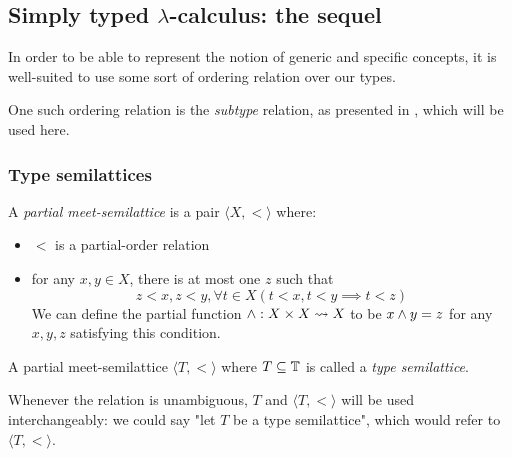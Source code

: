 \documentclass[main.tex]{subfiles}
\begin{document}
\subsection{Simply typed $\lambda$-calculus: the sequel}
\label{sec:lambda}

In order to be able to represent the notion of generic and specific concepts,
it is well-suited to use some sort of ordering relation over our types.

One such ordering relation is the \emph{subtype} relation, as presented in
\cite[chap.~15]{pierce}, which will be used here.


\subsubsection{Type semilattices}
\begin{defn}
    A \emph{partial meet-semilattice} is a pair $\langle X, \less \rangle$ where:
    \begin{itemize}
        \item $\less$ is a partial-order relation
        \item for any $x, y \in X$, there is at most one $z$ such that
        \[  z \less x, z \less y,
            \forall t \in X (t \less x, t \less y \implies t \less z) \]
        We can define the partial function $\wedge : X \times X \leadsto X$ to
        be $x \wedge y = z$ for any $x, y, z$ satisfying this condition.
    \end{itemize}
\end{defn}

\begin{defn}
    A partial meet-semilattice $\langle T, \less \rangle$ where
    $T \subseteq \mathbb{T}$ is called a \emph{type semilattice}.

    Whenever the relation is unambiguous, $T$ and $\langle T, \less \rangle$
    will be used interchangeably: we could say "let $T$ be a
    type semilattice", which would refer to $\langle T, \less \rangle$.
\end{defn}
\end{document}
